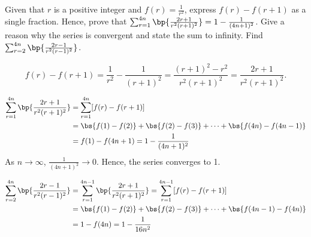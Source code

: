 \begin{problem}
    Given that $r$ is a positive integer and $f(r) = \frac1{r^2}$, express $f(r) - f(r+1)$ as a single fraction. Hence, prove that $\sum_{r=1}^{4n} \bp{\frac{2r+1}{r^2(r+1)^2}} = 1 - \frac1{(4n+1)^2}$. Give a reason why the series is convergent and state the sum to infinity. Find $\sum_{r=2}^{4n} \bp{\frac{2r-1}{r^2(r-1)^2}}$.
\end{problem}
\begin{solution}
    \[f(r) - f(r+1) = \frac1{r^2} - \frac1{(r+1)^2} = \frac{(r+1)^2 - r^2}{r^2(r+1)^2} = \frac{2r+1}{r^2(r+1)^2}.\]

    \begin{align*}
        \sum_{r=1}^{4n} \bp{\frac{2r+1}{r^2(r+1)^2}} &= \sum_{r=1}^{4n} [f(r) - f(r+1)]\\
        &= \bs{f(1) - f(2)} + \bs{f(2) - f(3)} + \cdots + \bs{f(4n) - f(4n-1)}\\
        &= f(1) - f(4n+1) = 1 - \frac{1}{(4n+1)^2}
    \end{align*}
    As $n \to \infty$, $\frac{1}{(4n+1)^2} \to 0$. Hence, the series converges to 1.

    \begin{align*}
        \sum_{r=2}^{4n} \bp{\frac{2r-1}{r^2(r-1)^2}} &= \sum_{r=1}^{4n-1} \bp{\frac{2r+1}{r^2(r+1)^2}} = \sum_{r=1}^{4n-1} [f(r) - f(r+1)]\\
        &= \bs{f(1) - f(2)} + \bs{f(2) - f(3)} + \cdots + \bs{f(4n-1) - f(4n)}\\
        &= 1 - f(4n) = 1 - \frac1{16n^2}
    \end{align*}
\end{solution}

